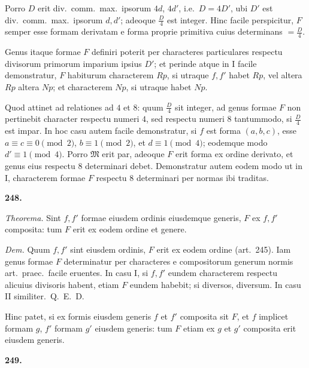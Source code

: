 \documentclass[12pt,a4paper]{article}
\theoremstyle{plain}
\theoremstyle{definition}
\theoremstyle{remark}
\begin{document}
Porro $D$ erit div.\ comm.\ max.\ ipsorum $4d$, $4d'$, i.e.\ $D = 4D'$, ubi $D'$ est div.\ comm.\ max.\ ipsorum $d, d'$; adeoque $\tfrac{D}{4}$ est integer. Hinc facile perspicitur, $F$ semper esse formam derivatam e forma proprie primitiva cuius determinans $= \tfrac{D}{4}$.

Genus itaque formae $F$ definiri poterit per characteres particulares respectu divisorum primorum imparium ipsius $D'$; et perinde atque in I facile demonstratur, $F$ habiturum characterem $Rp$, si utraque $f, f'$ habet $Rp$, vel altera $Rp$ altera $Np$; et characterem $Np$, si utraque habet $Np$.

Quod attinet ad relationes ad $4$ et $8$: quum $\tfrac{D}{4}$ sit integer, ad genus formae $F$ non pertinebit character respectu numeri $4$, sed respectu numeri $8$ tantummodo, si $\tfrac{D}{4}$ est impar. In hoc casu autem facile demonstratur, si $f$ est forma $(a, b, c)$, esse $a \equiv c \equiv 0 \pmod{2}$, $b \equiv 1 \pmod{2}$, et $d \equiv 1 \pmod{4}$; eodemque modo $d' \equiv 1 \pmod{4}$. Porro $\mathfrak{M}$ erit par, adeoque $F$ erit forma ex ordine derivato, et genus eius respectu $8$ determinari debet. Demonstratur autem eodem modo ut in I, characterem formae $F$ respectu $8$ determinari per normas ibi traditas.

\begin{center}\textbf{248.}\end{center}

\textit{Theorema.} Sint $f, f'$ formae eiusdem ordinis eiusdemque generis, $F$ ex $f, f'$ composita: tum $F$ erit ex eodem ordine et genere.

\textit{Dem.} Quum $f, f'$ sint eiusdem ordinis, $F$ erit ex eodem ordine (art.\ 245). Iam genus formae $F$ determinatur per characteres e compositorum generum normis art.\ praec.\ facile eruentes. In casu I, si $f, f'$ eundem characterem respectu alicuius divisoris habent, etiam $F$ eundem habebit; si diversos, diversum. In casu II similiter.\ Q.\ E.\ D.

Hinc patet, si ex formis eiusdem generis $f$ et $f'$ composita sit $F$, et $f$ implicet formam $g$, $f'$ formam $g'$ eiusdem generis: tum $F$ etiam ex $g$ et $g'$ composita erit eiusdem generis.

\begin{center}\textbf{249.}\end{center}
\end{document}
